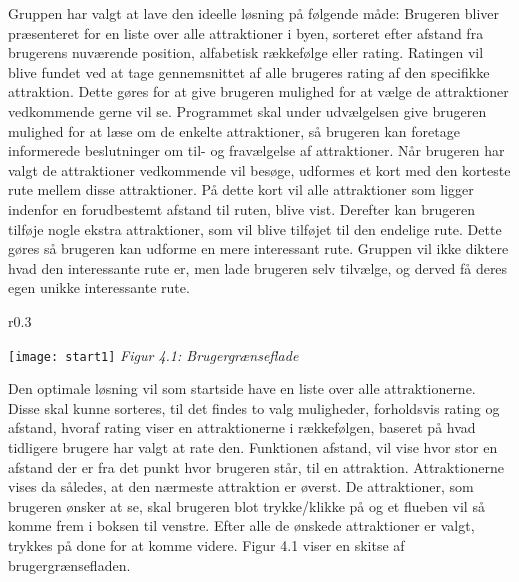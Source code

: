 Gruppen har valgt at lave den ideelle løsning på følgende måde:\newline
\newline
Brugeren bliver præsenteret for en liste over alle attraktioner i byen, sorteret efter afstand fra brugerens nuværende position, alfabetisk rækkefølge eller rating. \newline
Ratingen vil blive fundet ved at tage gennemsnittet af alle brugeres rating af den specifikke attraktion. Dette gøres for at give brugeren mulighed for at vælge de attraktioner vedkommende gerne vil se.
\newline
Programmet skal under udvælgelsen give brugeren mulighed for at læse om de enkelte attraktioner, så brugeren kan foretage informerede beslutninger om til- og fravælgelse af attraktioner.\newline
\newline
Når brugeren har valgt de attraktioner vedkommende vil besøge, udformes et kort med den korteste rute mellem disse attraktioner. På dette kort vil alle attraktioner som ligger indenfor en forudbestemt afstand til ruten, blive vist. Derefter kan brugeren tilføje nogle ekstra attraktioner, som vil blive tilføjet til den endelige rute.\newline
Dette gøres så brugeren kan udforme en mere interessant rute. Gruppen vil ikke diktere hvad den interessante rute er, men lade brugeren selv tilvælge, og derved få deres egen unikke interessante rute. \newline 


\begin{wrapfigure}{r}{0.3\textwidth}
	\vspace{-20pt}
	\begin{center}
		\texttt{[image: start1]} \newline
		\textit{Figur 4.1: Brugergrænseflade}\newline
	\end{center}
	\vspace{-20pt}
	\vspace{-20pt}
\end{wrapfigure}


Den optimale løsning vil som startside have en liste over alle attraktionerne. Disse skal kunne sorteres, til det findes to valg muligheder, forholdsvis rating og afstand, hvoraf rating viser en attraktionerne i rækkefølgen, baseret på hvad tidligere brugere har valgt at rate den. Funktionen afstand, vil vise hvor stor en afstand der er fra det punkt hvor brugeren står, til en attraktion. Attraktionerne vises da således, at den nærmeste attraktion er øverst. De attraktioner, som brugeren ønsker at se, skal brugeren blot trykke/klikke på og et flueben vil så komme frem i boksen til venstre. Efter alle de ønskede attraktioner er valgt, trykkes på done for at komme videre. Figur 4.1 viser en skitse af brugergrænsefladen. \newline
\newline
\newline
\newline

